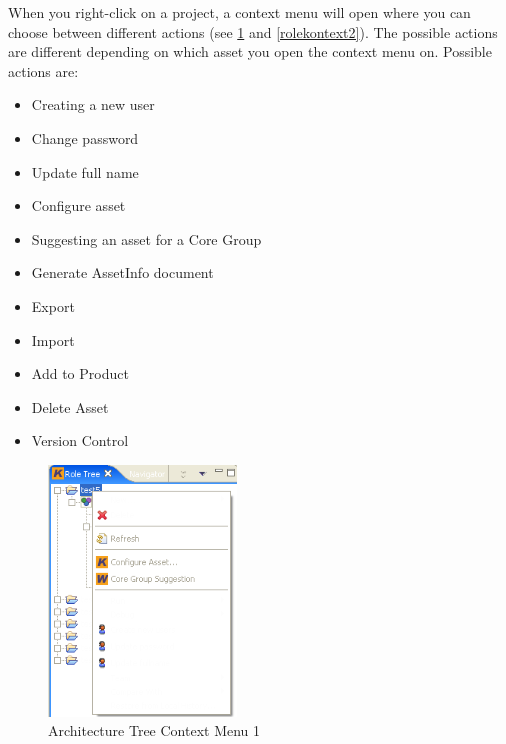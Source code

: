 When you right-click on a project, a context menu will open where you can choose 
between different actions (see \ref{rolekontext} and \ref{rolekontext2}). The possible actions are different
depending on which asset you open the context menu on. Possible actions are:

\begin{itemize}
	\item Creating a new user
	\item Change password
	\item Update full name
	\item Configure asset
	\item Suggesting an asset for a Core Group
	\item Generate AssetInfo document
	\item Export
	\item Import
	\item Add to Product
	\item Delete Asset
	\item Version Control
\end{itemize}

\begin{figure}[h!]
\begin{center}
\includegraphics[width=5cm]{rolekontext.png}
   \caption{Architecture Tree Context Menu 1}
\label{rolekontext}
\end{center}
\end{figure}\par

